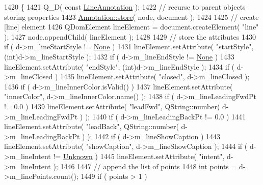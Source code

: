 \begin{DoxyCode}
1420 \{
1421     Q\_D( \textcolor{keyword}{const} \hyperlink{classOkular_1_1LineAnnotation}{LineAnnotation} );
1422     \textcolor{comment}{// recurse to parent objects storing properties}
1423     \hyperlink{classOkular_1_1Annotation_abbb607cf5929ffd06f789a22b353dcb3}{Annotation::store}( node, document );
1424 
1425     \textcolor{comment}{// create [line] element}
1426     QDomElement lineElement = document.createElement( \textcolor{stringliteral}{"line"} );
1427     node.appendChild( lineElement );
1428 
1429     \textcolor{comment}{// store the attributes}
1430     \textcolor{keywordflow}{if} ( d->m\_lineStartStyle != \hyperlink{classOkular_1_1LineAnnotation_a67e1128311347eabfd909909facabec6a48afe55289103ef17833562f7467deab}{None} )
1431         lineElement.setAttribute( \textcolor{stringliteral}{"startStyle"}, (\textcolor{keywordtype}{int})d->m\_lineStartStyle );
1432     \textcolor{keywordflow}{if} ( d->m\_lineEndStyle != \hyperlink{classOkular_1_1LineAnnotation_a67e1128311347eabfd909909facabec6a48afe55289103ef17833562f7467deab}{None} )
1433         lineElement.setAttribute( \textcolor{stringliteral}{"endStyle"}, (\textcolor{keywordtype}{int})d->m\_lineEndStyle );
1434     \textcolor{keywordflow}{if} ( d->m\_lineClosed )
1435         lineElement.setAttribute( \textcolor{stringliteral}{"closed"}, d->m\_lineClosed );
1436     \textcolor{keywordflow}{if} ( d->m\_lineInnerColor.isValid() )
1437         lineElement.setAttribute( \textcolor{stringliteral}{"innerColor"}, d->m\_lineInnerColor.name() );
1438     \textcolor{keywordflow}{if} ( d->m\_lineLeadingFwdPt != 0.0 )
1439         lineElement.setAttribute( \textcolor{stringliteral}{"leadFwd"}, QString::number( d->m\_lineLeadingFwdPt ) );
1440     \textcolor{keywordflow}{if} ( d->m\_lineLeadingBackPt != 0.0 )
1441         lineElement.setAttribute( \textcolor{stringliteral}{"leadBack"}, QString::number( d->m\_lineLeadingBackPt ) );
1442     \textcolor{keywordflow}{if} ( d->m\_lineShowCaption )
1443         lineElement.setAttribute( \textcolor{stringliteral}{"showCaption"}, d->m\_lineShowCaption );
1444     \textcolor{keywordflow}{if} ( d->m\_lineIntent != \hyperlink{classOkular_1_1LineAnnotation_a80458e2d982d5ef91ff18b850b34489fa19b01657e2f4e7fcffb081833b6c6fb9}{Unknown} )
1445         lineElement.setAttribute( \textcolor{stringliteral}{"intent"}, d->m\_lineIntent );
1446 
1447     \textcolor{comment}{// append the list of points}
1448     \textcolor{keywordtype}{int} points = d->m\_linePoints.count();
1449     \textcolor{keywordflow}{if} ( points > 1 )

\end{DoxyCode}
